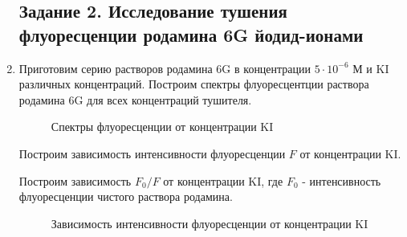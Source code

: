 \documentclass[a4paper,12pt]{article}
\begin{document}
\begin{enumerate}
    \subsection*{Задание 2. Исследование тушения флуоресценции родамина 6G йодид-ионами}
\item Приготовим серию растворов родамина 6G в концентрации $5 \cdot 10^{-6}$ М и KI различных концентраций. Построим спектры флуоресцентции раствора родамина 6G для всех концентраций тушителя. 

\begin{figure}[h!]
\caption{Спектры флуоресценции от концентрации KI}
\end{figure}

Построим зависимость интенсивности флуоресценции $F$ от концентрации KI. 

Построим зависимость $F_0/F$ от концентрации KI, где $F_0$ - интенсивность флуоресценции чистого раствора родамина.
\begin{figure}[h!]
\caption{Зависимость интенсивности флуоресценции от концентрации KI}
\end{figure}



\end{enumerate}
\end{document}
